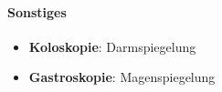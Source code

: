 \paragraph{Sonstiges}
\begin{itemize}
  \item \textbf{Koloskopie}: Darmspiegelung
  \item \textbf{Gastroskopie}: Magenspiegelung
\end{itemize}